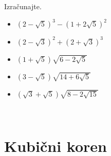 \begin{multicols}{2}
        
        
            \begin{naloga}
                Izračunajte.
                \begin{itemize}
                        \item $\left(2-\sqrt{5}\right)^3-\left(1+2\sqrt{5}\right)^2$ 
                        \item $\left(2-\sqrt{3}\right)^2+\left(2+\sqrt{3}\right)^3$ 
                        \item $\left(1+\sqrt{5}\right)\sqrt{6-2\sqrt{5}}$ 
                        \item $\left(3-\sqrt{5}\right)\sqrt{14+6\sqrt{5}}$ 
                        \item $\left(\sqrt{3}+\sqrt{5}\right)\sqrt{8-2\sqrt{15}}$ 
                \end{itemize}
            \end{naloga}

            ~~~~~~~~~~~~\\
            
        \end{multicols}








        \newpage
    \section{Kubični koren}

